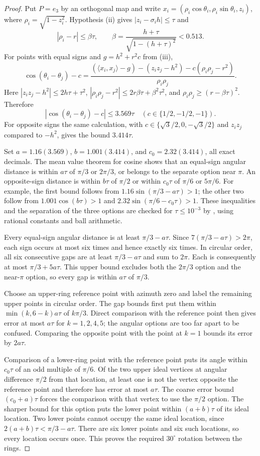 \documentclass[11pt]{article}
\theoremstyle{definition}
\begin{document}
\begin{proof}
Put $P=e_3$ by an orthogonal map and write
$x_i=(\rho_i\cos\theta_i,\rho_i\sin\theta_i,z_i)$, where $\rho_i=\sqrt{1-z_i^2}$.
Hypothesis (ii) gives $|z_i-\sigma_i h|\le\tau$ and
\[
 |\rho_i-r|\le\beta\tau,\qquad
 \beta=\frac{h+\tau}{\sqrt{1-(h+\tau)^2}}<0.513.
\]
For points with equal signs and $g=h^2+r^2c$ from (iii),
\[
 \cos(\theta_i-\theta_j)-c
 =\frac{(\langle x_i,x_j\rangle-g)-(z_i z_j-h^2)-c(\rho_i\rho_j-r^2)}{\rho_i\rho_j}.
\]
Here $|z_i z_j-h^2|\le2h\tau+\tau^2$,
$|\rho_i\rho_j-r^2|\le2r\beta\tau+\beta^2\tau^2$, and
$\rho_i\rho_j\ge(r-\beta\tau)^2$. Therefore
\[
 |\cos(\theta_i-\theta_j)-c|\le3.569\tau
 \quad(c\in\{1/2,-1/2,-1\}).
\]
For opposite signs the same calculation, with $c\in\{\sqrt3/2,0,-\sqrt3/2\}$ and
$z_i z_j$ compared to $-h^2$, gives the bound $3.414\tau$.

Set $a=1.16(3.569)$, $b=1.001(3.414)$, and $c_0=2.32(3.414)$, all exact decimals.
The mean value theorem for cosine shows that an equal-sign angular distance is within $a\tau$ of
$\pi/3$ or $2\pi/3$, or belongs to the separate option near $\pi$.
An opposite-sign distance is within $b\tau$ of $\pi/2$ or within $c_0\tau$ of $\pi/6$ or $5\pi/6$.
For example, the first bound follows from
$1.16\sin(\pi/3-a\tau)>1$; the other two follow from
$1.001\cos(b\tau)>1$ and $2.32\sin(\pi/6-c_0\tau)>1$.
These inequalities and the separation of the three options are checked for $\tau\le10^{-3}$ by
, using rational constants and ball arithmetic.

Every equal-sign angular distance is at least $\pi/3-a\tau$.
Since $7(\pi/3-a\tau)>2\pi$, each sign occurs at most six times and hence exactly six times.
In circular order, all six consecutive gaps are at least $\pi/3-a\tau$ and sum to $2\pi$.
Each is consequently at most $\pi/3+5a\tau$.
This upper bound excludes both the $2\pi/3$ option and the near-$\pi$ option, so every gap is within $a\tau$ of $\pi/3$.

Choose an upper-ring reference point with azimuth zero and label the remaining upper points in circular order.
The gap bounds first put them within $\min(k,6-k)a\tau$ of $k\pi/3$.
Direct comparison with the reference point then gives error at most $a\tau$ for $k=1,2,4,5$; the angular options are
too far apart to be confused. Comparing the opposite point with the point at $k=1$ bounds its error by $2a\tau$.

Comparison of a lower-ring point with the reference point puts its angle within $c_0\tau$ of an odd multiple
of $\pi/6$. Of the two upper ideal vertices at angular difference $\pi/2$ from that location, at least one is not
the vertex opposite the reference point and therefore has error at most $a\tau$.
The coarse error bound $(c_0+a)\tau$ forces the comparison with that vertex to use the $\pi/2$ option.
The sharper bound for this option puts the lower point within $(a+b)\tau$ of its ideal location.
Two lower points cannot occupy the same ideal location, since
$2(a+b)\tau<\pi/3-a\tau$. There are six lower points and six such locations, so every location occurs once.
This proves the required $30^\circ$ rotation between the rings.


\end{proof}
\end{document}
